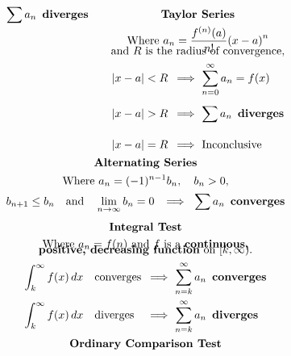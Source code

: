 \begin{center}
\begin{footnotesize}
\[\begin{gathered}
\begin{gathered}[t]
\begin{alignedat}{2}
  {\small\sum}\,a_n\enspace\mathbf{diverges}
\end{alignedat}\end{gathered}
\qquad
\begin{gathered}[t]\textbf{Taylor Series}\\
\text{Where \(\displaystyle a_n=\frac{f^{(n)}(a) }{ n! }{(x-a)}^n\)}\\[-1em]
\text{and \(R\) is the radius of convergence,}\\
\begin{alignedat}{2} &
  |x-a|<R
    &\enspace\implies\ &
  {\small\sum_{n=0}^\infty}\,a_n= f(x)
  \\[1ex] &
  |x-a|>R
    &\enspace\implies\ &
  {\small\sum}\,a_n\enspace\mathbf{diverges}
  \\[2.25ex] &
  |x-a|=R
    &\enspace\implies\ &
  \text{Inconclusive}
\end{alignedat}\end{gathered}
\\%
\begin{gathered}[t]\textbf{Alternating Series}\\
\text{Where \(a_n=(-1)^{n-1}b_n,\quad b_n>0,\)}\\
  b_{n+1}\le b_n
    \quad\text{and}\quad
  \lim_{n\to\infty}b_n=0
\enspace\implies\ {\small\sum}\,a_n\enspace\mathbf{converges}
\end{gathered}
\end{gathered}
\]
\pagebreak
\[
\begin{gathered}
\begin{gathered}[t]\textbf{Integral Test}\\
\text{Where \(a_n=f(n)\) and $f$ is a \textbf{continuous,}}\\[-1em]
\text{\textbf{positive, decreasing function} on \([k,\infty)\).}\\
\begin{alignedat}{2}
  \int_k^\infty f(x)\,dx
  &\quad\text{converges}
    &\enspace\implies\ &
  {\small\sum_{n=k}^\infty}\,a_n\enspace\mathbf{converges}
      \\
  \int_k^\infty f(x)\,dx
  &\quad\text{diverges}
    &\enspace\implies\ &
  {\small\sum_{n=k}^\infty}\,a_n\enspace\mathbf{diverges}
\end{alignedat}\end{gathered}
\\%
\begin{gathered}[t]\textbf{Ordinary Comparison Test}\\

\end{gathered}
\end{gathered}\]
\end{footnotesize}
\end{center}
